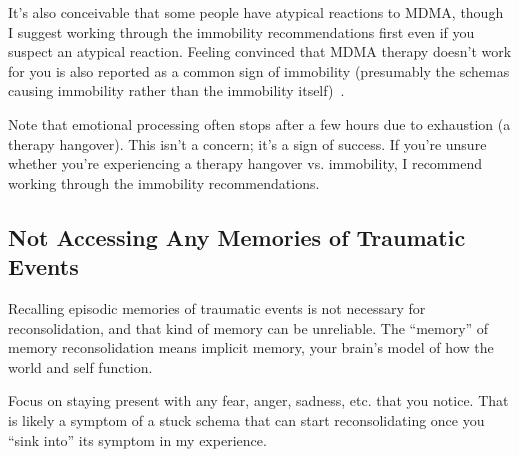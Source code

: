 \documentclass[11pt,oneside]{book}
\let\cite\parencite
\begin{document}
It's also conceivable that some people have atypical reactions to MDMA, though I suggest working through the immobility recommendations first even if you suspect an atypical reaction. Feeling convinced that MDMA therapy doesn't work for you is also reported as a common sign of immobility (presumably the schemas causing immobility rather than the immobility itself)~\cite{razviDissociation}.

Note that emotional processing often stops after a few hours due to exhaustion (a therapy hangover). This isn't a concern; it's a sign of success. If you're unsure whether you're experiencing a therapy hangover vs. immobility, I recommend working through the immobility recommendations.

\subsection{Not Accessing Any Memories of Traumatic Events}
Recalling episodic memories of traumatic events is not necessary for reconsolidation, and that kind of memory can be unreliable. The \enquote{memory} of memory reconsolidation means implicit memory, your brain's model of how the world and self function.

Focus on staying present with any fear, anger, sadness, etc. that you notice. That is likely a symptom of a stuck schema that can start reconsolidating once you \enquote{sink into} its symptom in my experience.
\end{document}
